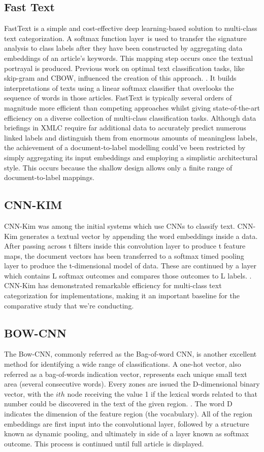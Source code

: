 \documentclass[a4paper]{article}
\begin{document}
\subsection{Fast Text}
FastText is a simple and cost-effective deep learning-based solution to multi-class text categorization. A softmax function layer is used to transfer the signature analysis to class labels after they have been constructed by aggregating data embeddings of an article's keywords. This mapping step occurs once the textual portrayal is produced. Previous work on optimal text classification tasks, like skip-gram and CBOW, influenced the creation of this approach. \cite{bib8}. It builds interpretations of texts using a linear softmax classifier that overlooks the sequence of words in those articles. FastText is typically several orders of magnitude more efficient than competing approaches whilst giving state-of-the-art efficiency on a diverse collection of multi-class classification tasks. Although data briefings in XMLC require far additional data to accurately predict numerous linked labels and distinguish them from enormous amounts of meaningless labels, the achievement of a document-to-label modelling could've been restricted by simply aggregating its input embeddings and employing a simplistic architectural style. This occurs because the shallow design allows only a finite range of document-to-label mappings.

\subsection{CNN-KIM}
CNN-Kim was among the initial systems which use CNNs to classify text. CNN-Kim generates a textual vector by appending the word embeddings inside a data. After passing across t filters inside this convolution layer to produce t feature maps, the document vectors has been transferred to a softmax timed pooling layer to produce the t-dimensional model of data. These are continued by a layer which contains L softmax outcomes and compares those outcomes to L labels. \cite{bib9}. CNN-Kim has demonstrated remarkable efficiency for multi-class text categorization for implementations, making it an important baseline for the comparative study that we're conducting.

\subsection{BOW-CNN}
The Bow-CNN, commonly referred as the Bag-of-word CNN, is another excellent method for identifying a wide range of classifications. A one-hot vector, also referred as a bag-of-words indication vector, represents each unique small text area (several consecutive words). Every zones are issued the D-dimensional binary vector, with the $ith$ node receiving the value 1 if the lexical words related to that number could be discovered in the text of the given region. \cite{bib8}. The word D indicates the dimension of the feature region (the vocabulary). All of the region embeddings are first input into the convolutional layer, followed by a structure known as dynamic pooling, and ultimately in side of a layer known as softmax outcome. This process is continued until full article is displayed.
\end{document}
